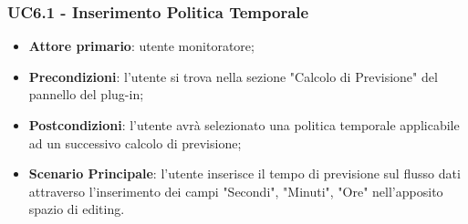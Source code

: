 	
	\label{par:UC6.1}
	\subsubsection{UC6.1 - Inserimento Politica Temporale}
		\begin{itemize}
			\item\textbf{Attore primario}: utente monitoratore;
			\item\textbf{Precondizioni}: l'utente si trova nella sezione "Calcolo di Previsione" del pannello del plug-in;
			\item\textbf{Postcondizioni}: l’utente avrà selezionato una politica temporale applicabile ad un successivo calcolo di previsione;
			\item\textbf{Scenario Principale}: l’utente inserisce il tempo di previsione sul flusso dati attraverso l'inserimento dei campi "Secondi", "Minuti", "Ore" nell’apposito spazio di editing.
		\end{itemize}	

	\label{par:UC6.2}
